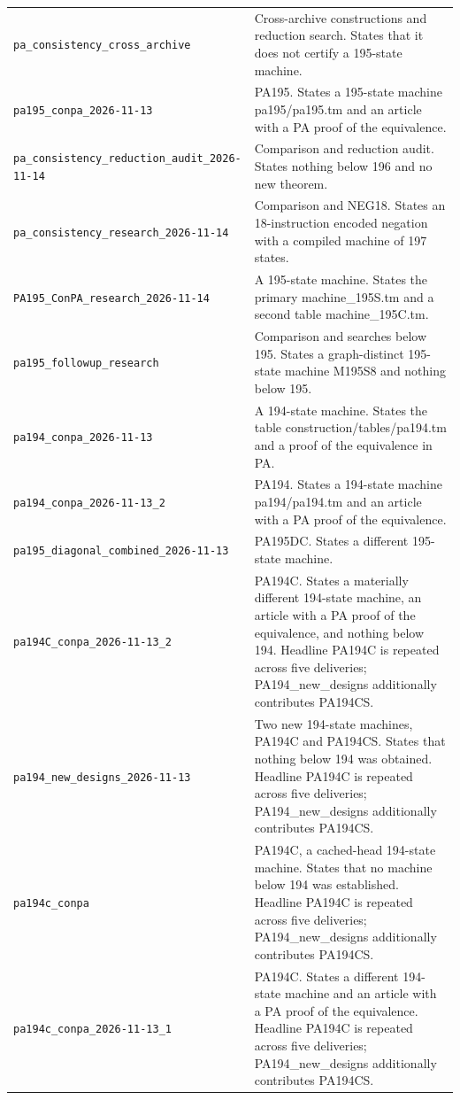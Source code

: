 {\begin{longtable}{p{}p{}}
\nolinkurl{pa_consistency_cross_archive} & Cross-archive constructions and reduction search. States that it does not certify a 195-state machine.\\[7pt]
\nolinkurl{pa195_conpa_2026-11-13} & PA195. States a 195-state machine pa195/pa195.tm and an article with a PA proof of the equivalence.\\[7pt]
\nolinkurl{pa_consistency_reduction_audit_2026-11-14} & Comparison and reduction audit. States nothing below 196 and no new theorem.\\[7pt]
\nolinkurl{pa_consistency_research_2026-11-14} & Comparison and NEG18. States an 18-instruction encoded negation with a compiled machine of 197 states.\\[7pt]
\nolinkurl{PA195_ConPA_research_2026-11-14} & A 195-state machine. States the primary machine\_195S.tm and a second table machine\_195C.tm.\\[7pt]
\nolinkurl{pa195_followup_research} & Comparison and searches below 195. States a graph-distinct 195-state machine M195S8 and nothing below 195.\\[7pt]
\nolinkurl{pa194_conpa_2026-11-13} & A 194-state machine. States the table construction/tables/pa194.tm and a proof of the equivalence in PA.\\[7pt]
\nolinkurl{pa194_conpa_2026-11-13_2} & PA194. States a 194-state machine pa194/pa194.tm and an article with a PA proof of the equivalence.\\[7pt]
\nolinkurl{pa195_diagonal_combined_2026-11-13} & PA195DC. States a different 195-state machine.\\[7pt]
\nolinkurl{pa194C_conpa_2026-11-13_2} & PA194C. States a materially different 194-state machine, an article with a PA proof of the equivalence, and nothing below 194. Headline PA194C is repeated across five deliveries; PA194\_new\_designs additionally contributes PA194CS.\\[7pt]
\nolinkurl{pa194_new_designs_2026-11-13} & Two new 194-state machines, PA194C and PA194CS. States that nothing below 194 was obtained. Headline PA194C is repeated across five deliveries; PA194\_new\_designs additionally contributes PA194CS.\\[7pt]
\nolinkurl{pa194c_conpa} & PA194C, a cached-head 194-state machine. States that no machine below 194 was established. Headline PA194C is repeated across five deliveries; PA194\_new\_designs additionally contributes PA194CS.\\[7pt]
\nolinkurl{pa194c_conpa_2026-11-13_1} & PA194C. States a different 194-state machine and an article with a PA proof of the equivalence. Headline PA194C is repeated across five deliveries; PA194\_new\_designs additionally contributes PA194CS.\\[7pt]

\end{longtable}}
